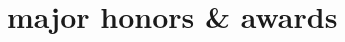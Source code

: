 \documentclass[]{friggeri-cv} %
\begin{document}
\begin{entrylist}
\end{entrylist}






\section{major honors \& awards}
\end{document}
